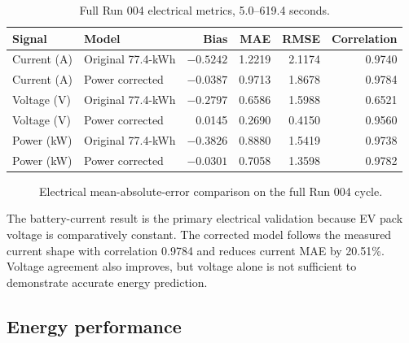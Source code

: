 \documentclass[11pt,letterpaper]{article}
\begin{document}
\begin{table}[H]
\centering
\caption{Full Run 004 electrical metrics, 5.0--619.4 seconds.}
\begin{tabular}{llrrrr}
\toprule
Signal & Model & Bias & MAE & RMSE & Correlation \\
\midrule
Current (A) & Original 77.4-kWh & $-0.5242$ & 1.2219 & 2.1174 & 0.9740 \\
Current (A) & Power corrected & $-0.0387$ & 0.9713 & 1.8678 & 0.9784 \\
Voltage (V) & Original 77.4-kWh & $-0.2797$ & 0.6586 & 1.5988 & 0.6521 \\
Voltage (V) & Power corrected & 0.0145 & 0.2690 & 0.4150 & 0.9560 \\
Power (kW) & Original 77.4-kWh & $-0.3826$ & 0.8880 & 1.5419 & 0.9738 \\
Power (kW) & Power corrected & $-0.0301$ & 0.7058 & 1.3598 & 0.9782 \\
\bottomrule
\end{tabular}
\end{table}

\begin{figure}[!htbp]
\centering
{}
\caption{Electrical mean-absolute-error comparison on the full Run 004 cycle.}
\end{figure}

The battery-current result is the primary electrical validation because EV
pack voltage is comparatively constant. The corrected model follows the
measured current shape with correlation 0.9784 and reduces current MAE by
20.51\%. Voltage agreement also improves, but voltage alone is not sufficient
to demonstrate accurate energy prediction.

\subsection{Energy performance}
\end{document}
